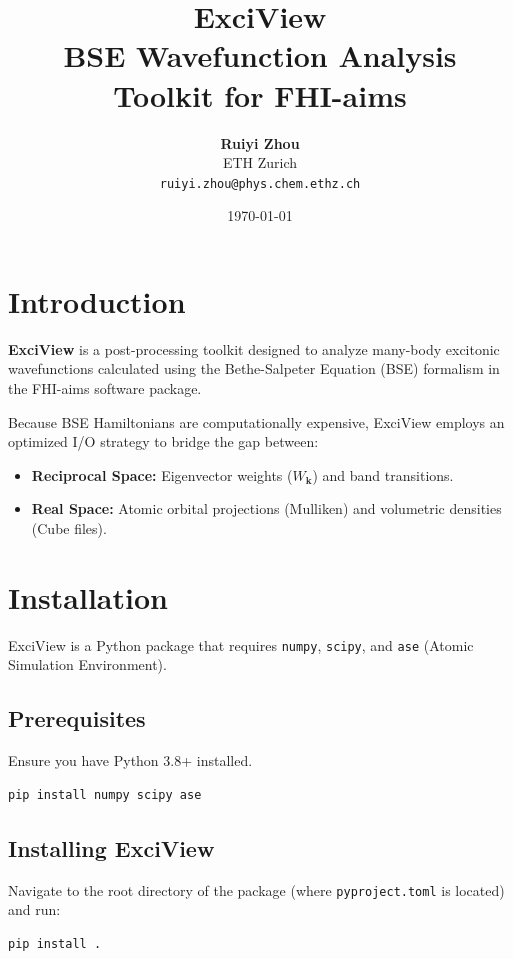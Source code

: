 \documentclass[a4paper,11pt]{article}
\title{\textbf{\Huge ExciView} \\ \Large BSE Wavefunction Analysis Toolkit for FHI-aims}
\author{\textbf{Ruiyi Zhou} \\ ETH Zurich \\ \texttt{ruiyi.zhou@phys.chem.ethz.ch}}
\date{\today}
\begin{document}
\maketitle
\tableofcontents
\newpage

\section{Introduction}
\textbf{ExciView} is a post-processing toolkit designed to analyze many-body excitonic wavefunctions calculated using the Bethe-Salpeter Equation (BSE) formalism in the FHI-aims software package. 

Because BSE Hamiltonians are computationally expensive, ExciView employs an optimized I/O strategy to bridge the gap between:
\begin{itemize}
    \item \textbf{Reciprocal Space:} Eigenvector weights ($W_{\mathbf{k}}$) and band transitions.
    \item \textbf{Real Space:} Atomic orbital projections (Mulliken) and volumetric densities (Cube files).
\end{itemize}

\section{Installation}
ExciView is a Python package that requires \texttt{numpy}, \texttt{scipy}, and \texttt{ase} (Atomic Simulation Environment).

\subsection{Prerequisites}
Ensure you have Python 3.8+ installed. 
\begin{lstlisting}[language=bash]
pip install numpy scipy ase
\end{lstlisting}

\subsection{Installing ExciView}
Navigate to the root directory of the package (where \texttt{pyproject.toml} is located) and run:
\begin{lstlisting}[language=bash]
pip install .
\end{lstlisting}
\end{document}
